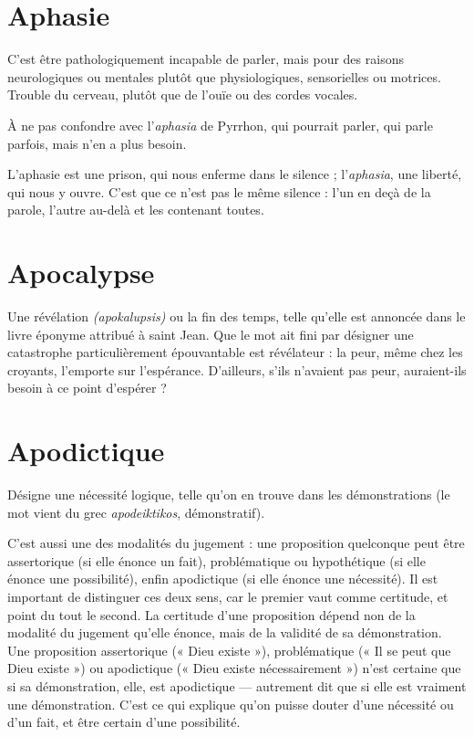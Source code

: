 \section{Aphasie}
C’est être pathologiquement incapable de parler, mais pour des
raisons neurologiques ou mentales plutôt que physiologiques,
sensorielles ou motrices. Trouble du cerveau, plutôt que de l’ouïe ou des cordes
vocales.

À ne pas confondre avec l’{\it aphasia} de Pyrrhon, qui pourrait parler, qui parle
parfois, mais n’en a plus besoin.

L’aphasie est une prison, qui nous enferme dans le silence ; l’{\it aphasia}, une
liberté, qui nous y ouvre. C’est que ce n’est pas le même silence : l’un en deçà
de la parole, l’autre au-delà et les contenant toutes.

\section{Apocalypse}
Une révélation {\it (apokalupsis)} ou la fin des temps, telle qu’elle
est annoncée dans le livre éponyme attribué à saint Jean. Que
le mot ait fini par désigner une catastrophe particulièrement épouvantable est
révélateur : la peur, même chez les croyants, l'emporte sur l’espérance.
D'ailleurs, s’ils n'avaient pas peur, auraient-ils besoin à ce point d’espérer ?

\section{Apodictique}
Désigne une nécessité logique, telle qu’on en trouve dans
les démonstrations (le mot vient du grec {\it apodeiktikos},
démonstratif).

C'est aussi une des modalités du jugement : une proposition quelconque
peut être assertorique (si elle énonce un fait), problématique ou hypothétique
(si elle énonce une possibilité), enfin apodictique (si elle énonce une nécessité).
Il est important de distinguer ces deux sens, car le premier vaut comme certitude,
et point du tout le second. La certitude d’une proposition dépend non de
la modalité du jugement qu’elle énonce, mais de la validité de sa démonstration.
Une proposition assertorique (« Dieu existe »), problématique (« Il se peut
que Dieu existe ») ou apodictique (« Dieu existe nécessairement ») n’est certaine
que si sa démonstration, elle, est apodictique — autrement dit que si elle
est vraiment une démonstration. C’est ce qui explique qu’on puisse douter
d’une nécessité ou d’un fait, et être certain d’une possibilité.

